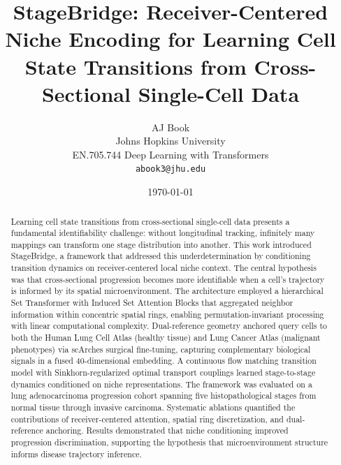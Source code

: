 \documentclass[11pt]{article}
\title{StageBridge: Receiver-Centered Niche Encoding for Learning Cell State Transitions from Cross-Sectional Single-Cell Data}
\author{
AJ Book \\
Johns Hopkins University \\
EN.705.744 Deep Learning with Transformers \\
\texttt{abook3@jhu.edu}
}
\date{\today}
\begin{document}
\maketitle

\begin{abstract}
Learning cell state transitions from cross-sectional single-cell data presents a fundamental identifiability challenge: without longitudinal tracking, infinitely many mappings can transform one stage distribution into another. This work introduced StageBridge, a framework that addressed this underdetermination by conditioning transition dynamics on receiver-centered local niche context. The central hypothesis was that cross-sectional progression becomes more identifiable when a cell's trajectory is informed by its spatial microenvironment. The architecture employed a hierarchical Set Transformer with Induced Set Attention Blocks that aggregated neighbor information within concentric spatial rings, enabling permutation-invariant processing with linear computational complexity. Dual-reference geometry anchored query cells to both the Human Lung Cell Atlas (healthy tissue) and Lung Cancer Atlas (malignant phenotypes) via scArches surgical fine-tuning, capturing complementary biological signals in a fused 40-dimensional embedding. A continuous flow matching transition model with Sinkhorn-regularized optimal transport couplings learned stage-to-stage dynamics conditioned on niche representations. The framework was evaluated on a lung adenocarcinoma progression cohort spanning five histopathological stages from normal tissue through invasive carcinoma. Systematic ablations quantified the contributions of receiver-centered attention, spatial ring discretization, and dual-reference anchoring. Results demonstrated that niche conditioning improved progression discrimination, supporting the hypothesis that microenvironment structure informs disease trajectory inference.
\end{abstract}












\end{document}

